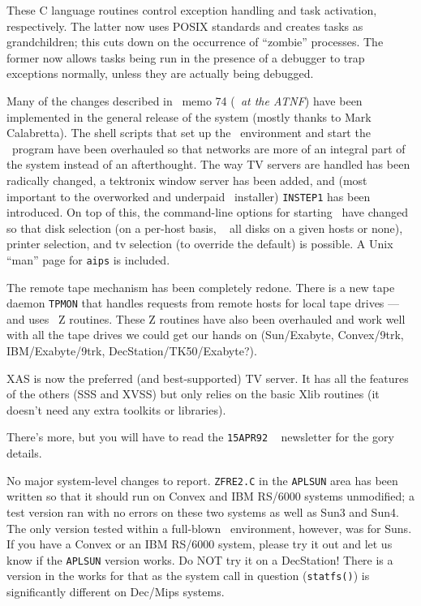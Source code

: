 These C language routines control exception handling and task
activation, respectively.  The latter now uses POSIX standards and
creates tasks as grandchildren; this cuts down on the occurrence of
``zombie'' processes.  The former now allows tasks being run in the
presence of a debugger to trap exceptions normally, unless they are
actually being debugged.\medskip



Many of the changes described in \AIPS\ memo 74 ({\it \AIPS\ at the
ATNF\/}) have been implemented in the general release of the system
(mostly thanks to Mark Calabretta).  The shell scripts that set up the
\AIPS\ environment and start the \AIPS\ program have been overhauled
so that networks are more of an integral part of the system instead of
an afterthought.  The way TV servers are handled has been radically
changed, a tektronix window server has been added, and (most important
to the overworked and underpaid \AIPS\ installer) {\tt INSTEP1} has
been introduced.  On top of this, the command-line options for
starting \AIPS\ have changed so that disk selection (on a per-host
basis, \ie~ all disks on a given hosts or none), printer selection,
and tv selection (to override the default) is possible.  A Unix
``man'' page for {\tt aips} is included.

The remote tape mechanism has been completely redone.  There is a new
tape daemon {\tt TPMON} that handles requests from remote hosts for
local tape drives --- and uses \AIPS\ Z routines.  These Z routines
have also been overhauled and work well with all the tape drives we
could get our hands on (Sun/Exabyte, Convex/9trk, IBM/Exabyte/9trk,
DecStation/TK50/Exabyte?).

XAS is now the preferred (and best-supported) TV server.  It has all
the features of the others (SSS and XVSS) but only relies on the basic
Xlib routines (it doesn't need any extra toolkits or libraries).

There's more, but you will have to read the {\tt 15APR92} \AIPS~
newsletter for the gory details.


No major system-level changes to report.  {\tt ZFRE2.C} in the
{\tt\dol APLSUN} area has been written so that it should run on Convex
and IBM RS/6000 systems unmodified; a test version ran with no errors
on these two systems as well as Sun3 and Sun4.  The only version
tested within a full-blown \AIPS\ environment, however, was for Suns.
If you have a Convex or an IBM RS/6000 system, please try it out and
let us know if the {\tt\dol APLSUN} version works.  Do NOT try it on a
DecStation!  There is a version in the works for that as the system
call in question ({\tt statfs()}) is significantly different on
Dec/Mips systems. \medskip

